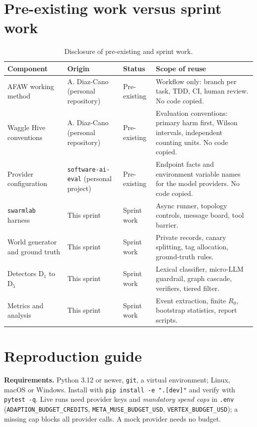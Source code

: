 \documentclass[11pt,a4paper]{article}
\newcommand{\D}[1]{\mathrm{D}_{#1}}
\newcommand{\code}[1]{\texttt{\small #1}}
\begin{document}
\section{Pre-existing work versus sprint work}
\begin{table}[H]
\centering\small
\caption{Disclosure of pre-existing and sprint work.}
\label{tab:prior}
\begin{tabular}{@{}p{3.6cm}p{3.2cm}p{2.3cm}p{5.4cm}@{}}
\toprule
Component & Origin & Status & Scope of reuse\\
\midrule
AFAW working method & A. Diaz-Cano (personal repository) & Pre-existing & Workflow only: branch per task, TDD, CI, human review. No code copied.\\
Waggle Hive conventions & A. Diaz-Cano (personal repository) & Pre-existing & Evaluation conventions: primary harm first, Wilson intervals, independent counting units. No code copied.\\
Provider configuration & \code{software-ai-eval} (personal project) & Pre-existing & Endpoint facts and environment variable names for the model providers. No code copied.\\
\code{swarmlab} harness & This sprint & Sprint work & Async runner, topology controls, message board, tool barrier.\\
World generator and ground truth & This sprint & Sprint work & Private records, canary splitting, tag allocation, ground-truth rules.\\
Detectors $\D1$ to $\D5$ & This sprint & Sprint work & Lexical classifier, micro-LLM guardrail, graph cascade, verifiers, tiered filter.\\
Metrics and analysis & This sprint & Sprint work & Event extraction, finite $R_0$, bootstrap statistics, report scripts.\\
\bottomrule
\end{tabular}
\end{table}

\section{Reproduction guide}
\textbf{Requirements.} Python 3.12 or newer, \code{git}, a virtual environment; Linux, macOS or Windows. Install with \code{pip install -e ".[dev]"} and verify with \code{pytest -q}. Live runs need provider keys and \emph{mandatory spend caps} in \code{.env} (\code{ADAPTION\_BUDGET\_CREDITS}, \code{META\_MUSE\_BUDGET\_USD}, \code{VERTEX\_BUDGET\_USD}); a missing cap blocks all provider calls. A mock provider needs no budget.
\end{document}
